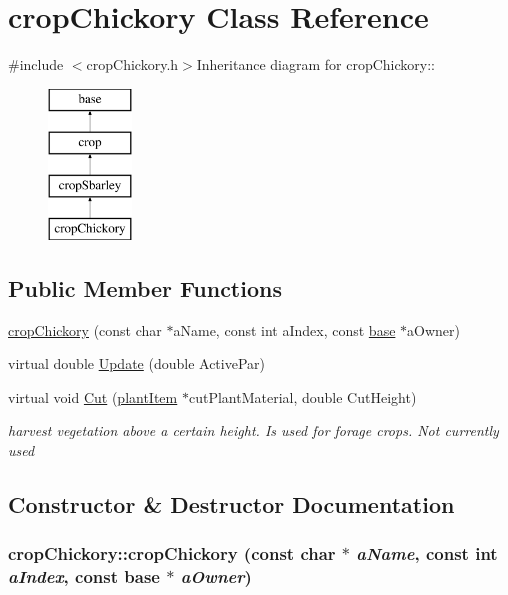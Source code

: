 \hypertarget{classcrop_chickory}{
\section{cropChickory Class Reference}
\label{classcrop_chickory}
}


{\ttfamily \#include $<$cropChickory.h$>$}Inheritance diagram for cropChickory::\begin{figure}[H]
\begin{center}
\leavevmode
\includegraphics[height=4cm]{classcrop_chickory}
\end{center}
\end{figure}
\subsection*{Public Member Functions}
\begin{DoxyCompactItemize}
\item 
\hyperlink{classcrop_chickory_a45eba92f7103e66f01fe54009872f824}{cropChickory} (const char $\ast$aName, const int aIndex, const \hyperlink{classbase}{base} $\ast$aOwner)
\item 
virtual double \hyperlink{classcrop_chickory_adef10cd7666f588810ba6d71c581e289}{Update} (double ActivePar)
\item 
virtual void \hyperlink{classcrop_chickory_ad29787a097e6f6239285473a1b5c85ad}{Cut} (\hyperlink{classplant_item}{plantItem} $\ast$cutPlantMaterial, double CutHeight)
\begin{DoxyCompactList}\small\item\em harvest vegetation above a certain height. Is used for forage crops. Not currently used \item\end{DoxyCompactList}\end{DoxyCompactItemize}


\subsection{Constructor \& Destructor Documentation}
\hypertarget{classcrop_chickory_a45eba92f7103e66f01fe54009872f824}{
\subsubsection[{cropChickory}]{\setlength{\rightskip}{0pt plus 5cm}cropChickory::cropChickory (const char $\ast$ {\em aName}, \/  const int {\em aIndex}, \/  const {\bf base} $\ast$ {\em aOwner})}}
\label{classcrop_chickory_a45eba92f7103e66f01fe54009872f824}


